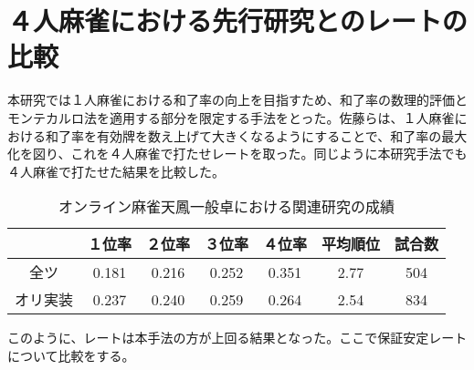 \section{４人麻雀における先行研究とのレートの比較} %
本研究では１人麻雀における和了率の向上を目指すため、和了率の数理的評価とモンテカルロ法を適用する部分を限定する手法をとった。佐藤らは、１人麻雀における和了率を有効牌を数え上げて大きくなるようにすることで、和了率の最大化を図り、これを４人麻雀で打たせレートを取った。同じように本研究手法でも４人麻雀で打たせた結果を比較した。


\begin{table}[htbp]
  \caption{オンライン麻雀天鳳一般卓における関連研究の成績}
  \label{tb:bakuuti_score}
  \begin{center}
  \begin{tabular}{c|c|c|c|c|c|c}
    \hline
    	     & １位率 & ２位率 & ３位率 & ４位率 & 平均順位 & 試合数\\\hline\hline
    全ツ 	& 0.181 & 0.216 & 0.252 &0.351 & 2.77 & 504\\\hline
    オリ実装 & 0.237 &0.240 & 0.259 &0.264 & 2.54 & 834\\\hline
  \end{tabular}\end{center}
\end{table}

このように、レートは本手法の方が上回る結果となった。ここで保証安定レートについて比較をする。




